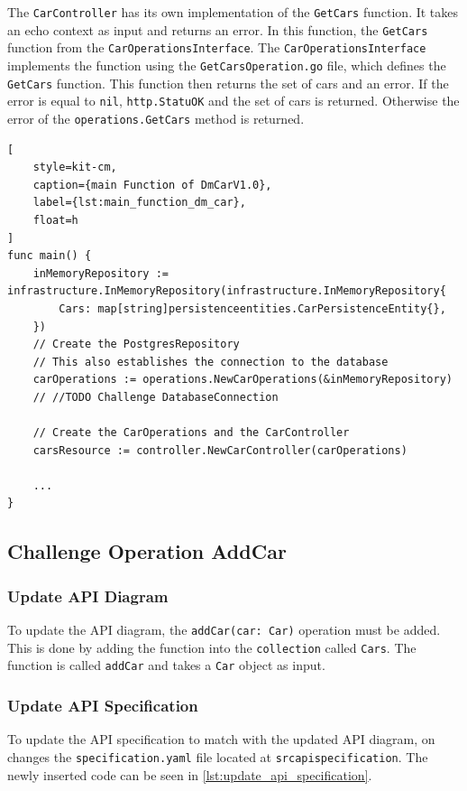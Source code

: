The \texttt{CarController} has its own implementation of the \texttt{GetCars} function.
It takes an echo context as input and returns an error.
In this function, the \texttt{GetCars} function from the \texttt{CarOperationsInterface}.
The \texttt{CarOperationsInterface} implements the function using the \texttt{GetCarsOperation.go} file, which defines the \texttt{GetCars} function.
This function then returns the set of cars and an error.
If the error is equal to \texttt{nil}, \texttt{http.StatuOK} and the set of cars is returned.
Otherwise the error of the \texttt{operations.GetCars} method is returned.
\begin{lstlisting}[
    style=kit-cm,
    caption={main Function of DmCarV1.0},
    label={lst:main_function_dm_car},
    float=h
]
func main() {
    inMemoryRepository := infrastructure.InMemoryRepository(infrastructure.InMemoryRepository{
        Cars: map[string]persistenceentities.CarPersistenceEntity{},
    })
    // Create the PostgresRepository
    // This also establishes the connection to the database
    carOperations := operations.NewCarOperations(&inMemoryRepository)
    // //TODO Challenge DatabaseConnection

    // Create the CarOperations and the CarController
    carsResource := controller.NewCarController(carOperations)

    ...
}
\end{lstlisting}


\subsection{Challenge Operation AddCar}
\subsubsection*{Update API Diagram}
To update the API diagram, the \texttt{addCar(car: Car)} operation must be added.
This is done by adding the function into the \texttt{collection} called \texttt{Cars}.
The function is called \texttt{addCar} and takes a \texttt{Car} object as input.
\subsubsection*{Update API Specification}
To update the API specification to match with the updated API diagram, on changes the \texttt{specification.yaml} file located at \texttt{src\/api\/specification\/}.
The newly inserted code can be seen in \autoref*{lst:update_api_specification}.

